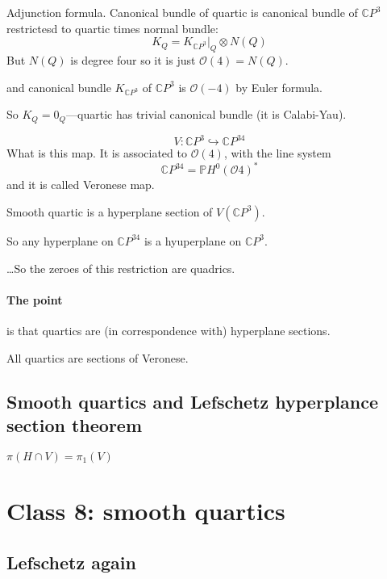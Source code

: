 \begin{remark}
	Adjunction formula. Canonical bundle of quartic is canonical bundle of $\mathbb{C}P^{3}$ restrictesd to quartic times normal bundle:
	\[K_Q=K_{\mathbb{C}P^{3}}|_{Q}\otimes N(Q)\]
	But $N(Q)$ is degree four so it is just $\mathcal{O}(4)=N(Q)$.

	and canonical bundle $K_{\mathbb{C}P^{3}}$ of $\mathbb{C}P^{3}$ is $\mathcal{O}(-4)$ by Euler formula.

	So $K_Q=0_Q$---quartic has trivial canonical bundle (it is Calabi-Yau).
\end{remark}

\[V:\mathbb{C}P^{3}\hookrightarrow \mathbb{C}P^{34}\]
What is this map. It is associated to $\mathcal{O}(4)$, with the line system
\[\mathbb{C}P^{34}=\mathbb{P}H^{0}(\mathcal{O}4)^*\]
and it is called Veronese map.

\begin{claim}
	Smooth quartic is a hyperplane section of $V(\mathbb{C}P^{3})$.
\end{claim}

So any hyperplane on $\mathbb{C}P^{34}$ is a hyuperplane on $\mathbb{C}P^{3}$.

…So the zeroes of this restriction are quadrics.

\paragraph{The point} is that quartics are (in correspondence with) hyperplane sections.

All quartics are sections of Veronese.

\subsection{Smooth quartics and Lefschetz hyperplance section theorem}

\begin{thm}\leavevmode
	$ \pi(H\cap V)=\pi_1(V)$
\end{thm}

\section{Class 8: smooth quartics}

\subsection{Lefschetz again}

